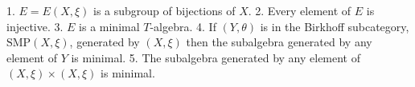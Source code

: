 1. $E = E(X, \xi)$ is a subgroup of bijections of $X$.
2. Every element of $E$ is injective.
3. $E$ is a minimal $T$-algebra.
4. If $(Y, \theta)$ is in the Birkhoff subcategory, $\text{SMP}(X, \xi)$, generated by $(X, \xi)$ then the subalgebra generated by any element of $Y$ is minimal.
5. The subalgebra generated by any element of $(X, \xi) \times (X, \xi)$ is minimal.
